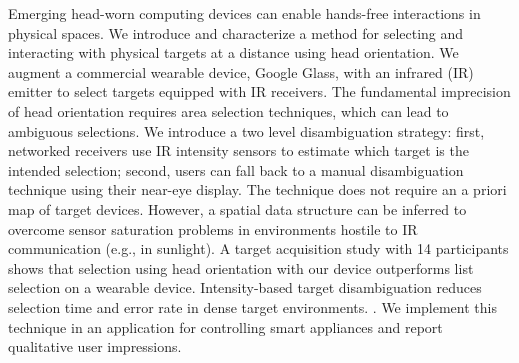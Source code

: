 
Emerging head-worn computing devices can enable hands-free interactions in physical spaces. 
%
We introduce and characterize a method for selecting and interacting with physical targets at a distance using head orientation. We augment a commercial wearable device, Google Glass, with an infrared (IR) emitter to select targets equipped with IR receivers. The fundamental imprecision of head orientation requires area selection techniques, which can lead to ambiguous selections. We introduce a two level disambiguation strategy: first, networked receivers use IR intensity sensors to estimate which target is the intended selection; second, users can fall back to a manual disambiguation technique using their near-eye display. The technique does not require an a priori map of target devices. However, a spatial data structure can be inferred to overcome sensor saturation problems in environments hostile to IR communication (e.g., in sunlight). 
%
A target acquisition study with 14 participants shows that selection using head orientation with our device outperforms list selection on a wearable device. Intensity-based target disambiguation reduces selection time and error rate in dense target environments. . We implement this technique in an application for controlling smart appliances and report qualitative user impressions.